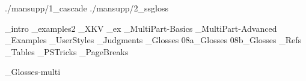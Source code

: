 




\gathertags


%
\get ./mansupp/1_cascade
\get ./mansupp/2_ssgloss
\bye


_intro
_examples2
_XKV
_ex
_MultiPart-Basics
_MultiPart-Advanced
_Examples
_UserStyles
_Judgments
_Glosses
\get 08a_Glosses
\get 08b_Glosses
_Refs
_Tables
_PSTricks
_PageBreaks
%



\bye
_Glosses-multi

